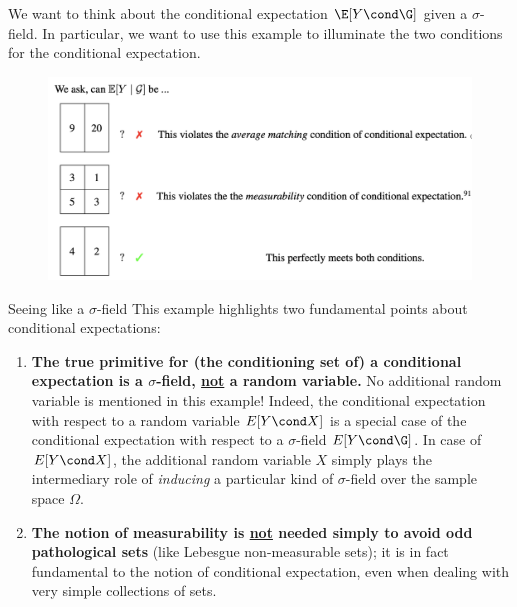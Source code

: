 \documentclass[10pt]{beamer}
\begin{document}
 
 \begin{frame}
 	
 We want to think about the conditional expectation $\E[Y \cond \G]$ given a $\sigma$-field.  In particular, we want to use this example to illuminate the two conditions for the conditional expectation. 
 
\begin{figure}[H]
\centering
\includegraphics[width=1.0\textwidth]{images/example_conditional_expectation_given_a_sigma_field}
\end{figure}

 \end{frame}


\begin{frame}{Seeing like a $\sigma$-field} This example  highlights two fundamental points about conditional expectations:
\begin{enumerate}
\item \textbf{The true primitive for (the conditioning set of) a conditional expectation is a $\sigma$-field, \underline{not} a random variable.}  No additional random variable is mentioned in this example!  Indeed, the conditional expectation with respect to a random variable $E[Y \cond X]$ is a special case of the conditional expectation with respect to a $\sigma$-field $E[Y \cond \G]$.  In case of $E[Y \cond X]$,  the additional random variable $X$ simply plays the intermediary role of \textit{inducing} a particular kind of $\sigma$-field over the sample space $\Omega$. 
\item \textbf{The notion of measurability is \underline{not} needed simply to avoid odd pathological sets} (like Lebesgue non-measurable sets); it is in fact fundamental to the notion of conditional expectation, even when dealing with very simple collections of sets.
\end{enumerate}	
\end{frame}
\end{document}
